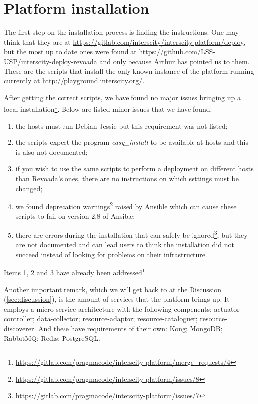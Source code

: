 \documentclass[paper=a4, fontsize=11pt]{scrartcl}
\numberwithin{equation}{section}    %
\numberwithin{figure}{section}      %
\numberwithin{table}{section}        %
\begin{document}
\section{Platform installation}
\label{sec:platinst}
  The first step on the installation process is finding the instructions. One may think that they are at \url{https://gitlab.com/interscity/interscity-platform/deploy}, but the most up to date ones were found at \url{https://github.com/LSS-USP/interscity-deploy-revoada} and only because Arthur has pointed us to them. These are the scripts that install the only known instance of the platform running currently at \url{http://playground.interscity.org/}.

  After getting the correct scripts, we have found no major issues bringing up a local installation\footnote{\label{installation-mr}\url{https://gitlab.com/pragmacode/interscity-platform/merge_requests/4}}. Below are listed minor issues that we have found:

  \begin{enumerate}
    \item the hosts must run Debian Jessie but this requirement was not listed;
    \item the scripts expect the program \textit{easy\_install} to be available at hosts and this is also not documented;
    \item if you wish to use the same scripts to perform a deployment on different hosts than Revoada's ones, there are no instructions on which settings must be changed;
    \item we found deprecation warnings\footnote{\url{https://gitlab.com/pragmacode/interscity-platform/issues/8}} raised by Ansible which can cause these scripts to fail on version 2.8 of Ansible;
    \item there are errors during the installation that can safely be ignored\footnote{\url{https://gitlab.com/pragmacode/interscity-platform/issues/7}}, but they are not documented and can lead users to think the installation did not succeed instead of looking for problems on their infrastructure.
  \end{enumerate}

  Items 1, 2 and 3 have already been addressed\textsuperscript{\ref{installation-mr}}.

  Another important remark, which we will get back to at the Discussion (\ref{sec:discussion}), is the amount of services that the platform brings up. It employs a micro-service architecture with the following components: actuator-controller; data-collector; resource-adaptor; resource-cataloguer; resource-discoverer. And these have requirements of their own: Kong; MongoDB; RabbitMQ; Redis; PostgreSQL.
\end{document}
